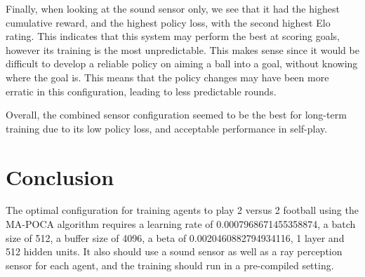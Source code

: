 \documentclass{LSkill}
\begin{document}
Finally, when looking at the sound sensor only, we see that it had the highest cumulative reward, and the highest policy loss, with the second highest Elo rating. This indicates that this system may perform the best at scoring goals, however its training is the most unpredictable. This makes sense since it would be difficult to develop a reliable policy on aiming a ball into a goal, without knowing where the goal is. This means that the policy changes may have been more erratic in this configuration, leading to less predictable rounds. 

Overall, the combined sensor configuration seemed to be the best for long-term training due to its low policy loss, and acceptable performance in self-play. 

\section{Conclusion}
\label{sec:conclusion}


The optimal configuration for training agents to play 2 versus 2 football using the MA-POCA algorithm requires a learning rate of 0.0007968671455358874, a batch size of 512, a buffer size of 4096, a beta of 0.0020460882794934116, 1 layer and 512 hidden units. It also should use a sound sensor as well as a ray perception sensor for each agent, and the training should run in a pre-compiled setting. 



\end{document}
